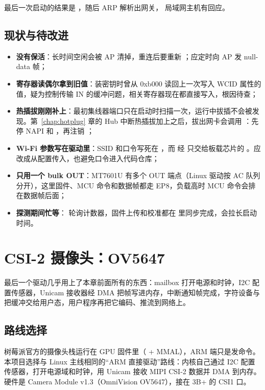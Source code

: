 最后一次启动的结果是 ，随后 ARP 解析出网关， 局域网主机有回应。

\subsection{现状与待改进}

\begin{itemize}
  \item \textbf{没有保活}：长时间空闲会被 AP 清掉，重连后要重新 ；应定时向 AP 发 null-data 帧；
  \item \textbf{寄存器读偶尔拿到旧值}：装密钥时曾从 0xb000 读回上一次写入 WCID 属性的值，疑为控制传输 IN 的缓冲问题，相关寄存器现在都直接写入，根因待查；
  \item \textbf{热插拔刚刚补上}：最初集线器端口只在启动时扫描一次，运行中拔插不会被发现。第~\ref{chap:hotplug} 章的 Hub 中断热插拔加上之后，拔出网卡会调用 ：先停 NAPI 和 ，再注销 ；
  \item \textbf{Wi-Fi 参数写在驱动里}：SSID 和口令写死在 ，而  经  只交给板载芯片的 。应改成从配置传入，也避免口令进入代码仓库；
  \item \textbf{只用一个 bulk OUT}：MT7601U 有多个 OUT 端点（Linux 驱动按 AC 队列分开），这里固件、MCU 命令和数据帧都走 EP8，负载高时 MCU 命令会排在数据帧后面；
  \item \textbf{探测期间忙等}： 轮询计数器，固件上传和校准都在  里同步完成，会拉长启动时间。
\end{itemize}

\section{CSI-2 摄像头：OV5647}
\label{sec:camera}

最后一个驱动几乎用上了本章前面所有的东西：mailbox 打开电源和时钟，I2C 配置传感器，Unicam 接收器经 DMA 把帧写进内存，中断通知帧完成，字符设备与  把缓冲交给用户态，用户程序再把它编码、推流到网络上。

\subsection{路线选择}

树莓派官方的摄像头栈运行在 GPU 固件里（ + MMAL），ARM 端只是发命令。本项目选择与 Linux 主线相同的“ARM 直接驱动”路线：内核自己通过 I2C 配置传感器，打开电源域和时钟，用 Unicam 接收 MIPI CSI-2 数据并 DMA 到内存。硬件是 Camera Module v1.3（OmniVision OV5647），接在 3B+ 的 CSI1 口。

